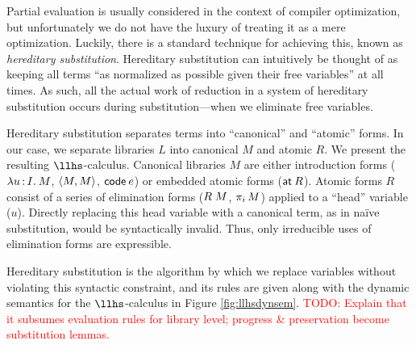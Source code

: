 \documentclass[11pt]{article}
\newcommand{\todo}[1]{\textcolor{red}{\small TODO: #1}}
\begin{document}




Partial evaluation is usually considered in the context of compiler
optimization, but unfortunately we do not have the luxury of treating it as a
mere optimization. Luckily, there is a standard technique for achieving this,
known as \emph{hereditary substitution}. Hereditary substitution can intuitively
be thought of as keeping all terms ``as normalized as possible given their free
variables'' at all times. As such, all the actual work of reduction in a system
of hereditary substitution occurs during substitution---when we eliminate free
variables.

Hereditary substitution separates terms into ``canonical'' and ``atomic'' forms.
In our case, we separate libraries $L$ into canonical $M$ and atomic $R$. We
present the resulting $\llhs$-calculus. Canonical libraries $M$ are either
introduction forms ($\lambda u \mathop{:} I .\: M$, $\left\langle M,M\right\rangle$, $\textsf{code}\:{e}$) or embedded atomic
forms ($\textsf{at}\:{R}$). Atomic forms $R$ consist of a series of elimination forms ($R
\; M$, $\pi_{i} \, M$) applied to a ``head'' variable ($u$). Directly replacing
this head variable with a canonical term, as in na\"ive substitution, would be
syntactically invalid. Thus, only irreducible uses of elimination forms are
expressible.

Hereditary substitution is the algorithm by which we replace variables without
violating this syntactic constraint, and its rules are given along with the
dynamic semantics for the $\llhs$-calculus in Figure \ref{fig:llhsdynsem}.
\todo{Explain that it subsumes evaluation rules for library level; progress \&
  preservation become substitution lemmas.}
\end{document}
